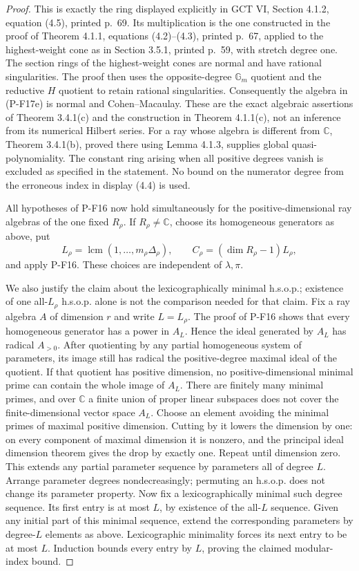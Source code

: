\documentclass[11pt,a4paper]{article}
\begin{document}
\begin{proof}
This is exactly the ring displayed explicitly in GCT VI,
Section 4.1.2, equation (4.5), printed p.~69. Its multiplication is
the one constructed in the proof of Theorem 4.1.1,
equations (4.2)--(4.3), printed p.~67, applied to the highest-weight
cone as in Section 3.5.1, printed p.~59, with stretch degree one.
The section rings of the highest-weight cones are normal and have
rational singularities. The proof then uses the opposite-degree
$\mathbb G_m$ quotient and the reductive $H$ quotient to retain
rational singularities. Consequently the algebra in (P-F17e) is
normal and Cohen--Macaulay. These are the exact algebraic assertions
of Theorem 3.4.1(c) and the construction in Theorem 4.1.1(c), not an
inference from its numerical Hilbert series. For a ray whose algebra
is different from $\mathbb C$,
Theorem 3.4.1(b), proved there using Lemma 4.1.3, supplies global
quasi-polynomiality. The constant ring arising when all positive
degrees vanish is excluded as specified in the statement. No bound
on the numerator degree from the erroneous index in display (4.4)
is used.

All hypotheses of P-F16 now hold simultaneously for the
positive-dimensional ray algebras of the one fixed $R_\rho$.
If $R_\rho\ne\mathbb C$,
choose its homogeneous generators as above, put
\[
 L_\rho=\operatorname{lcm}(1,\ldots,m_\rho\Delta_\rho),\qquad
 C_\rho=(\dim R_\rho-1)L_\rho,
\]
and apply P-F16. These choices are independent of $\lambda,\pi$.

We also justify the claim about the lexicographically minimal h.s.o.p.;
existence of one all-$L_\rho$ h.s.o.p. alone is not the comparison
needed for that claim. Fix a ray algebra $A$ of dimension $r$ and
write $L=L_\rho$. The proof of P-F16 shows that every homogeneous
generator has a power in $A_L$. Hence the ideal generated by $A_L$
has radical $A_{>0}$. After quotienting by any partial homogeneous
system of parameters, its image still has radical the positive-degree
maximal ideal of the quotient. If that quotient has positive
dimension, no positive-dimensional minimal prime can contain the
whole image of $A_L$. There are finitely many minimal primes, and
over $\mathbb C$ a finite union of proper linear subspaces does not
cover the finite-dimensional vector space $A_L$. Choose an element
avoiding the minimal primes of maximal positive dimension. Cutting
by it lowers the dimension by one: on every component of maximal
dimension it is nonzero, and the principal ideal dimension theorem
gives the drop by exactly one. Repeat until dimension zero. This
extends any partial parameter sequence by parameters all of degree
$L$. Arrange parameter degrees nondecreasingly; permuting an h.s.o.p.
does not change its parameter property. Now fix a lexicographically
minimal such degree sequence. Its first
entry is at most $L$, by existence of the all-$L$ sequence. Given
any initial part of this minimal sequence, extend the corresponding
parameters by degree-$L$ elements as above. Lexicographic minimality
forces its next entry to be at most $L$. Induction bounds every
entry by $L$, proving the claimed modular-index bound.


\end{proof}
\end{document}
